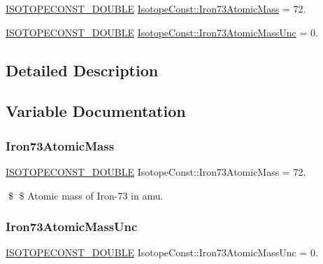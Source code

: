 \begin{DoxyCompactItemize}
\item 
\mbox{\hyperlink{group___isotope_const-_macros_ga8f45a7272ce02c0b4c65c44636ed719a}{I\+S\+O\+T\+O\+P\+E\+C\+O\+N\+S\+T\+\_\+\+D\+O\+U\+B\+LE}} \mbox{\hyperlink{group___isotope_const-_iron-_fe73_ga10555e8247d2c50031e868b6786de7d8}{Isotope\+Const\+::\+Iron73\+Atomic\+Mass}} = 72.
\item 
\mbox{\hyperlink{group___isotope_const-_macros_ga8f45a7272ce02c0b4c65c44636ed719a}{I\+S\+O\+T\+O\+P\+E\+C\+O\+N\+S\+T\+\_\+\+D\+O\+U\+B\+LE}} \mbox{\hyperlink{group___isotope_const-_iron-_fe73_gac6e99a85b0df26ff21bbc4e4a6ad97c9}{Isotope\+Const\+::\+Iron73\+Atomic\+Mass\+Unc}} = 0.
\end{DoxyCompactItemize}


\subsection{Detailed Description}


\subsection{Variable Documentation}
\mbox{\label{group___isotope_const-_iron-_fe73_ga10555e8247d2c50031e868b6786de7d8}} 
\subsubsection{\texorpdfstring{Iron73\+Atomic\+Mass}{Iron73AtomicMass}}
{\footnotesize\ttfamily \mbox{\hyperlink{group___isotope_const-_macros_ga8f45a7272ce02c0b4c65c44636ed719a}{I\+S\+O\+T\+O\+P\+E\+C\+O\+N\+S\+T\+\_\+\+D\+O\+U\+B\+LE}} Isotope\+Const\+::\+Iron73\+Atomic\+Mass = 72.}

\$ \$ Atomic mass of Iron-\/73 in amu. \mbox{\label{group___isotope_const-_iron-_fe73_gac6e99a85b0df26ff21bbc4e4a6ad97c9}} 
\subsubsection{\texorpdfstring{Iron73\+Atomic\+Mass\+Unc}{Iron73AtomicMassUnc}}
{\footnotesize\ttfamily \mbox{\hyperlink{group___isotope_const-_macros_ga8f45a7272ce02c0b4c65c44636ed719a}{I\+S\+O\+T\+O\+P\+E\+C\+O\+N\+S\+T\+\_\+\+D\+O\+U\+B\+LE}} Isotope\+Const\+::\+Iron73\+Atomic\+Mass\+Unc = 0.}

